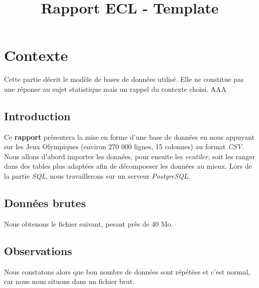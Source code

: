 \documentclass{mytex}
\title{Rapport ECL - Template} %
\begin{document}




        
\fairemarges %
\fairepagedegarde %
\tabledematieres %


\section{Contexte} 

Cette partie décrit le modèle de bases de données utilisé. Elle ne constitue pas une réponse au sujet statistique mais un rappel du contexte choisi.
AAA

\subsection {Introduction}
Ce \textbf{rapport} présentera la mise en forme d'une base de données en nous appuyant sur les Jeux Olympiques (environ 270 000 lignes, 15 colonnes) au format \emph{CSV}. Nous allons d'abord importer les données, pour ensuite les \emph{ventiler}, soit les ranger dans des tables plus adaptées afin de décompoeser les données au mieux. Lors de la partie \emph{SQL}, nous travaillerons sur un serveur \emph{PostgreSQL}.

\subsection{Données brutes}

Nous obtenons le fichier suivant, pesant près de 40 Mo.



\subsection{Observations}
Nous constatons alors que bon nombre de données sont répétées et c'est normal, car nous nous situons dans un fichier brut.
\end{document}
